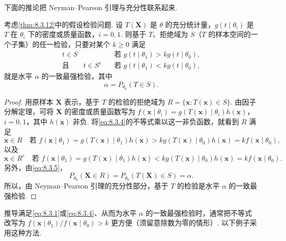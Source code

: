 下面的推论把 Neyman–Pearson 引理与充分性联系起来.
\begin{corollary}\label{cor:8.3.13}
考虑\autoref{thm:8.3.12}中的假设检验问题. 设 $T(\boldsymbol X)$ 是 $\theta$ 的充分统计量，$g(t\mid\theta_i)$ 是 $T$ 在 $\theta_i$ 下的密度或质量函数，$i=0,1$. 则基于 $T$、拒绝域为 $S$（$T$ 的样本空间的一个子集）的任一检验，只要对某个 $k\ge0$ 满足
\begin{equation}\label{eq:8.3.4}
\begin{aligned}t\in S&\quad\text{若 }g(t\mid\theta_1)>kg(t\mid\theta_0),\\
\text{且}\qquad t\in S^c&\quad\text{若 }g(t\mid\theta_1)<kg(t\mid\theta_0),\end{aligned}
\end{equation}
就是水平 $\alpha$ 的一致最强检验，其中
\begin{equation}\label{eq:8.3.5}\alpha=P_{\theta_0}(T\in S).\end{equation}
\end{corollary}
\begin{proof}
用原样本 $\boldsymbol X$ 表示，基于 $T$ 的检验的拒绝域为 $R=\{\boldsymbol x:T(\boldsymbol x)\in S\}$. 由因子分解定理，可将 $\boldsymbol X$ 的密度或质量函数写为 $f(\boldsymbol x\mid\theta_i)=g(T(\boldsymbol x)\mid\theta_i)h(\boldsymbol x)$，$i=0,1$，其中 $h(\boldsymbol x)$ 非负. 将\eqref{eq:8.3.4}的不等式乘以这一非负函数，就看到 $R$ 满足
$$\boldsymbol x\in R\quad\text{若 }f(\boldsymbol x\mid\theta_1)=g(T(\boldsymbol x)\mid\theta_1)h(\boldsymbol x)>kg(T(\boldsymbol x)\mid\theta_0)h(\boldsymbol x)=kf(\boldsymbol x\mid\theta_0),$$
以及
$$\boldsymbol x\in R^c\quad\text{若 }f(\boldsymbol x\mid\theta_1)=g(T(\boldsymbol x)\mid\theta_1)h(\boldsymbol x)<kg(T(\boldsymbol x)\mid\theta_0)h(\boldsymbol x)=kf(\boldsymbol x\mid\theta_0).$$
另外，由\eqref{eq:8.3.5}，
$$P_{\theta_0}(\boldsymbol X\in R)=P_{\theta_0}(T(\boldsymbol X)\in S)=\alpha.$$
所以，由 Neyman–Pearson 引理的充分性部分，基于 $T$ 的检验是水平 $\alpha$ 的一致最强检验.
\end{proof}
推导满足\eqref{eq:8.3.1}或\eqref{eq:8.3.4}、从而为水平 $\alpha$ 的一致最强检验时，通常把不等式改写为 $f(\boldsymbol x\mid\theta_1)/f(\boldsymbol x\mid\theta_0)>k$ 更方便（须留意除数为零的情形\mbox{）.} 以下例子采用这种方法.
